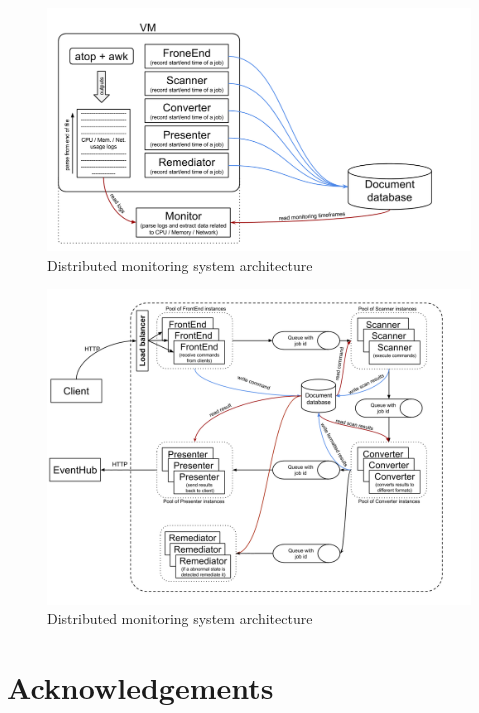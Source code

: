 \documentclass[fleqn,10pt]{./class/wlscirep}
\begin{document}
\begin{figure}[ht]
\centering
\includegraphics[width=\linewidth]{./img/MonitoringCPUMechanismExtended.png}
\caption{Distributed monitoring system architecture}
\label{fig:monitoringArchitectureExtended}
\end{figure}


\begin{figure}[ht]
\centering
\includegraphics[width=\linewidth]{./img/MonitoringSystemArchitectureRemediation.png}
\caption{Distributed monitoring system architecture}
\label{fig:systemArchitecture}
\end{figure}






\section*{Acknowledgements}
\end{document}
